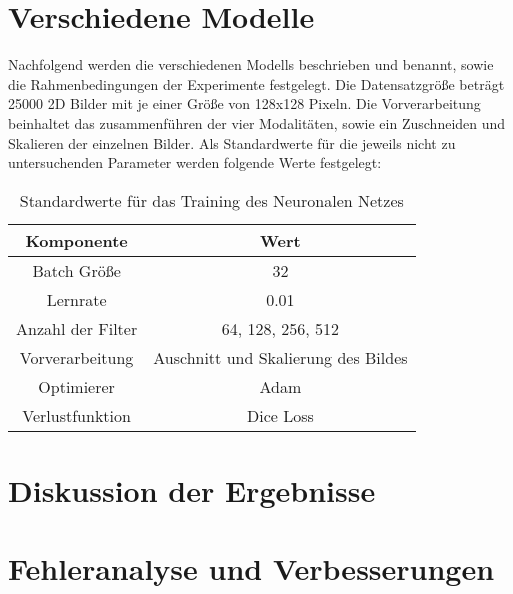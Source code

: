 \section{Verschiedene Modelle}
Nachfolgend werden die verschiedenen \glspl{Modell} beschrieben und benannt, sowie die Rahmenbedingungen der Experimente festgelegt. Die Datensatzgröße beträgt 25000 2D Bilder mit je einer Größe von 128x128 Pixeln. Die Vorverarbeitung beinhaltet das zusammenführen der vier Modalitäten, sowie ein Zuschneiden und Skalieren der einzelnen Bilder. Als Standardwerte für die jeweils nicht zu untersuchenden Parameter werden folgende Werte festgelegt:

\begin{table}[h!]
\begin{longtable}{|c|c|}
	\hline
		\multicolumn{1}{|c|}{\textbf{Komponente}} & \multicolumn{1}{c|}{\textbf{Wert}} \\
		\endhead
	\hline
		Batch Größe & 32 \\
	\hline
		Lernrate & 0.01 \\
	\hline
		Anzahl der Filter & 64, 128, 256, 512 \\
	\hline
		Vorverarbeitung & Auschnitt und Skalierung des Bildes \\
	\hline
		Optimierer & Adam \\
	\hline
		Verlustfunktion & Dice Loss \\
	\hline
\end{longtable}
\caption{Standardwerte für das Training des Neuronalen Netzes}
\end{table}



\section{Diskussion der Ergebnisse}
\section{Fehleranalyse und Verbesserungen}
